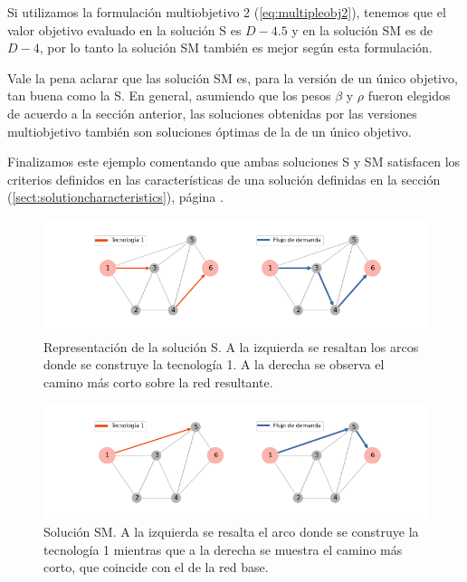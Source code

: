 \documentclass{article}
\begin{document}
  Si utilizamos la formulación multiobjetivo 2 (\ref{eq:multipleobj2}), tenemos que el valor objetivo evaluado en la solución S es $D - 4.5$ y en la solución SM es de $D - 4$, por lo tanto la solución SM también es mejor según esta formulación.

  Vale la pena aclarar que las solución SM es, para la versión de un único objetivo, tan buena como la S. En general, asumiendo que los pesos $\beta$ y $\rho$ fueron elegidos de acuerdo a la sección anterior, las soluciones obtenidas por las versiones multiobjetivo también son soluciones óptimas de la de un único objetivo.

  Finalizamos este ejemplo comentando que ambas soluciones S y SM satisfacen los criterios definidos en las características de una solución definidas en la sección (\ref{sect:solutioncharacteristics}), página \pageref{sect:solutioncharacteristics}.

  \begin{figure}[h!]
    \centering
    \includegraphics[width=12cm]{../resources/example_2_sol_v2.png}
    \caption{Representación de la solución S. A la izquierda se resaltan los arcos donde se construye la tecnología 1. A la derecha se observa el camino más corto sobre la red resultante.}
    \label{fig:example2solv2}
  \end{figure}

  \begin{figure}[h!]
    \centering
    \includegraphics[width=12cm]{../resources/example_2_sol_v1.png}
    \caption{Solución SM. A la izquierda se resalta el arco donde se construye la tecnología 1 mientras que a la derecha se muestra el camino más corto, que coincide con el de la red base.}
    \label{fig:example2solv1}
  \end{figure}
\end{document}

